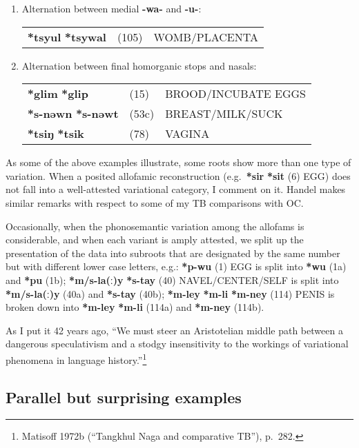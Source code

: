 \begin{enumerate}
\item %
Alternation between medial \textbf{-wa-} and \textbf{-u-}:

\begin{tabular}{lll}
\textbf{*tsyul} \STEDTU{⪤} \textbf{*tsywal} &(105)	&WOMB/PLACENTA\\
\end{tabular}

\item \label{itm:hom-var} %
Alternation between final homorganic stops and nasals:\nopagebreak[4]

\begin{tabular}{lll}
\textbf{*glim} \STEDTU{⪤} \textbf{*glip} 	&(15)	&BROOD/INCUBATE EGGS\\
\textbf{*s-nəwn} \STEDTU{⪤} \textbf{*s-nəwt} &(53c)	&BREAST/MILK/SUCK\\
\textbf{*tsiŋ} \STEDTU{⪤} \textbf{*tsik} &(78)	 	&VAGINA\\
\end{tabular}
\end{enumerate}


As some of the above examples illustrate, some roots show more than one type
of variation. When a posited allofamic reconstruction (e.g.\ \textbf{*sir}  \textbf{*sit} (6)
EGG) does not fall into a well-attested variational category, I comment on it. 
Handel makes similar remarks with respect to some of my TB comparisons with OC.


Occasionally, when the phonosemantic variation among the allofams is
considerable, and when each variant is amply attested, we split up the
presentation of the data into subroots that are designated by the same number
but with different lower case letters, e.g.: \textbf{*p-wu} (1) EGG is split into \textbf{*wu}
(1a) and \textbf{*pu} (1b);
\textbf{*m/s-la(ː)y}  \textbf{*s-tay} (40) NAVEL/CENTER/SELF is split into
\textbf{*m/s-la(ː)y} (40a) and \textbf{*s-tay} (40b);
\textbf{*m-ley}  \textbf{*m-li}  \textbf{*m-ney} (114) PENIS is
broken down into \textbf{*m-ley}  \textbf{*m-li} (114a)
and \textbf{*m-ney} (114b).


As I put it 42 years ago, “We must steer an Aristotelian middle path between
a dangerous speculativism and a stodgy insensitivity to the workings of
variational phenomena in language history.”\footnote{Matisoff 1972b (“Tangkhul
Naga and comparative TB”), p.~282.}

\subsection{Parallel but surprising examples}

